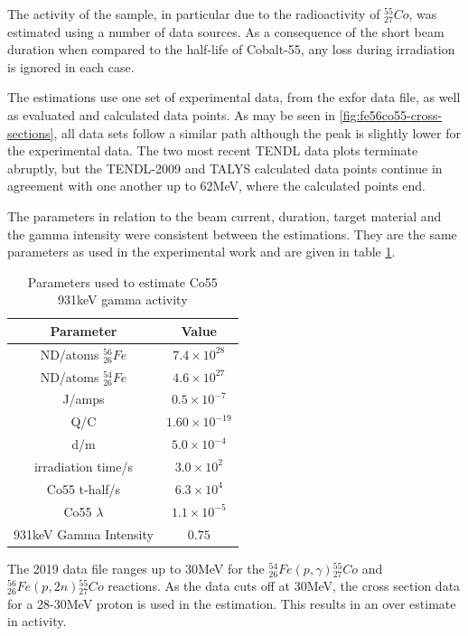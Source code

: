 The activity of the sample, in particular due to the radioactivity of ${}^{55}_{27}Co$, was estimated using a number of data sources.  As a consequence of the short beam duration when compared to the half-life of Cobalt-55, any loss during irradiation is ignored in each case.  

The estimations use one set of experimental data, from the \acrshort{exfor} data file, as well as evaluated and calculated data points.  As may be seen in \ref{fig:fe56co55-cross-sections}, all data sets follow a similar path although the peak is slightly lower for the experimental data.  The two most recent TENDL data plots terminate abruptly, but the TENDL-2009 and TALYS calculated data points continue in agreement with one another up to 62MeV, where the calculated points end.

The parameters in relation to the beam current, duration, target material and the gamma intensity were consistent between the estimations.  They are the same parameters as used in the experimental work and are given in table \ref{table:activityestimation1}.

\FloatBarrier
\begin{table}[h]
\begin{center}
\begin{tabular}{c c}
\hline\hline
Parameter & Value\\
\hline\hline
ND/atoms ${}^{56}_{26}Fe$ & $7.4 \times 10^{28}$ \\
ND/atoms ${}^{54}_{26}Fe$ & $4.6 \times 10^{27}$ \\
J/amps & $0.5 \times 10^{-7}$ \\
Q/C & $1.60 \times 10^{-19}$ \\
d/m & $5.0 \times 10^{-4}$ \\
irradiation time/s & $3.0 \times 10^{2}$ \\
Co55 t-half/s & $6.3 \times 10^{4}$ \\
Co55 $\lambda$ & $1.1 \times 10^{-5}$ \\
931keV Gamma Intensity & $0.75$ \\
\hline\hline
\end{tabular}
\end{center}
\caption{Parameters used to estimate Co55 931keV gamma activity}
\label{table:activityestimation1}
\end{table}

The 2019 data file ranges up to 30MeV for the ${}^{54}_{26} Fe (p, \gamma) {}^{55}_{27} Co$ and ${}^{56}_{26} Fe (p, 2n) {}^{55}_{27} Co$ reactions.  As the data cuts off at 30MeV, the cross section data for a 28-30MeV proton is used in the estimation.  This results in an over estimate in activity.

